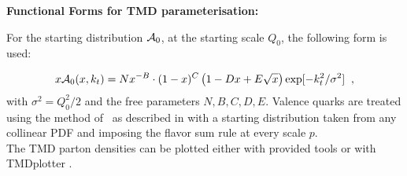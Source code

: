 \begin{description}
\vspace{0.1cm}
\item \bf {Functional Forms for TMD parameterisation:} \rm

For the starting distribution ${\cal A}_0$, at the starting scale $Q_0$, 
the following form is used:

{\small{ 
\begin{eqnarray}
x{\cal A}_0(x,\kt) = N x^{-B} \cdot (1 -x)^{C}\left( 1 -D x 
+ E \sqrt{x}   \right) 
   \exp[ - k_t^2 / \sigma^2 ]  \;\; , 
\label{a0-5par}
\end{eqnarray}
       }}
with $ \sigma^2  =  Q_0^2 / 2 $ and the free parameters $N,B,C,D, E$.
Valence quarks are treated  using the method of~\cite{Deak:2010gk} as described 
in \cite{Hautmann:2013tba} with a starting distribution taken from any collinear PDF
and imposing the flavor sum rule at every scale $p$.
\\
The TMD parton densities can be plotted either with \fitter provided tools 
or with TMDplotter \cite{tmdlref}.

\end{description}



